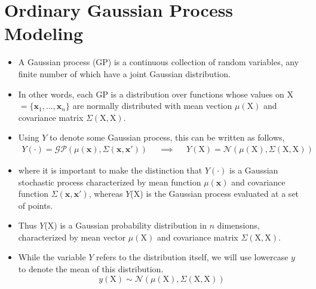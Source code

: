 \documentclass[11pt]{article}
\begin{document}
\section{Ordinary Gaussian Process Modeling}
\begin{itemize}
\item A Gaussian process (GP) is a continuous collection of random variables,
any finite number of which have a joint Gaussian distribution.
\item In other words, each GP is a distribution over functions whose
values on X$= \{\mathbf{x}_1,...,\mathbf{x}_n\}$
are normally distributed with mean vection $\mu(\mathrm{X})$ and covariance
matrix $\Sigma(\mathrm{X, X})$.
\item Using $Y$ to denote some Gaussian process, this can be written as
follows,
\begin{align*}
	Y(\cdot)
=
	\mathcal{GP}
	\left(
		\mu(\mathbf{x}),
		\Sigma(\mathbf{x}, \mathbf{x}')
	\right)
&& \implies &&
	Y(\mathrm{X})
=
	\mathcal{N}
	\left(
		\mu(\mathrm{X}),
		\Sigma(\mathrm{X, X})
	\right)
\end{align*}
\item where it is important to make the distinction that $Y(\cdot)$ is a
Gaussian stochastic process characterized by mean function $\mu(\mathbf{x})$
and covariance function $\Sigma(\mathbf{x}, \mathbf{x'})$, whereas $Y$(X) is
the Gaussian process evaluated at a set of points.
\item Thus $Y$(X) is a Gaussian probability distribution in $n$ dimensions,
characterized by mean vector $\mu(\mathrm{X})$ and covariance matrix
$\Sigma(\mathrm{X, X})$.
\item While the variable $Y$ refers to the distribution itself, we will use
lowercase $y$ to denote the mean of this distribution.
\begin{equation*}
	y(\mathrm{X})
\sim
	\mathcal{N}
	\left(
		\mu(\mathrm{X}),
		\Sigma(\mathrm{X, X})
	\right)
\end{equation*}
\end{itemize}
\end{document}
